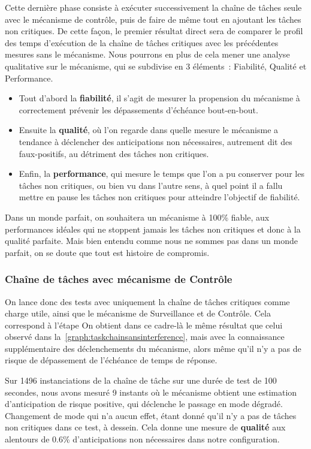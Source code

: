 \documentclass[french, a4paper, 11pt, twoside, pdftex]{StyleThese}
\begin{document}
Cette dernière phase consiste à exécuter successivement la chaîne de tâches seule avec le mécanisme de contrôle, puis de faire de même tout en ajoutant les tâches non critiques. De cette façon, le premier résultat direct sera de comparer le profil des temps d'exécution de la chaîne de tâches critiques avec les précédentes mesures sans le mécanisme. Nous pourrons en plus de cela mener une analyse qualitative sur le mécanisme, qui se subdivise en 3 éléments~: Fiabilité, Qualité et Performance.
\begin{itemize}
	\item Tout d'abord la \textbf{fiabilité}, il s'agit de mesurer la propension du mécanisme à correctement prévenir les dépassements d'échéance bout-en-bout. 
	\item Ensuite la \textbf{qualité}, où l'on regarde dans quelle mesure le mécanisme a tendance à déclencher des anticipations non nécessaires, autrement dit des faux-positifs, au détriment des tâches non critiques. 
	\item Enfin, la \textbf{performance}, qui mesure le temps que l'on a pu conserver pour les tâches non critiques, ou bien vu dans l'autre sens, à quel point il a fallu mettre en pause les tâches non critiques pour atteindre l'objectif de fiabilité. 
\end{itemize}
Dans un monde parfait, on souhaitera un mécanisme à 100\% fiable, aux performances idéales qui ne stoppent jamais les tâches non critiques et donc à la qualité parfaite. Mais bien entendu comme nous ne sommes pas dans un monde parfait, on se doute que tout est histoire de compromis.


\subsubsection{Chaîne de tâches avec mécanisme de Contrôle}

On lance donc des tests avec uniquement la chaîne de tâches critiques comme charge utile, ainsi que le mécanisme de Surveillance et de Contrôle. Cela correspond à l'étape  On obtient dans ce cadre-là le même résultat que celui observé dans la~\autoref{graph:taskchainsansinterference}, mais avec la connaissance supplémentaire des déclenchements du mécanisme, alors même qu'il n'y a pas de risque de dépassement de l'échéance de temps de réponse. 

Sur 1496 instanciations de la chaîne de tâche sur une durée de test de 100 secondes, nous avons mesuré 9 instants où le mécanisme obtient une estimation d'anticipation de risque positive, qui déclenche le passage en mode dégradé. Changement de mode qui n'a aucun effet, étant donné qu'il n'y a pas de tâches non critiques dans ce test, à dessein. Cela donne une mesure de \textbf{qualité} aux alentours de 0.6\% d'anticipations non nécessaires dans notre configuration.
\end{document}
